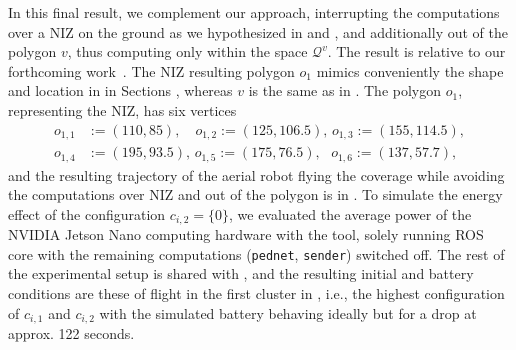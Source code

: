 In this final result, we complement our approach, interrupting the computations over a NIZ on the ground as we hypothesized in  and , and additionally out of the polygon $v$, thus computing only within the space $\mathcal{Q}^v$. The result is relative to our forthcoming work~\citep{seewald202Xenergy}. The NIZ resulting polygon $o_1$ mimics conveniently the shape and location in  in Sections , whereas $v$ is the same as in . The polygon $o_1$, representing the NIZ, has six vertices
\begin{equation}\begin{split}
  o_{1,1}&:=(110,85),\,\,\,\,\,\,o_{1,2}:=(125,106.5),\,o_{1,3}:=(155,114.5),\\
  o_{1,4}&:=(195,93.5),\,o_{1,5}:=(175,76.5),\,\,\,\,o_{1,6}:=(137,57.7),
\end{split}\end{equation}
and the resulting trajectory of the aerial robot flying the coverage while avoiding the computations over NIZ and out of the polygon is in .
To simulate the energy effect of the configuration $c_{i,2}=\{0\}$, we evaluated the average power of the NVIDIA Jetson Nano computing hardware with the \powprof{} tool, solely running ROS core with the remaining computations ({\small\tt pednet}, {\small\tt sender}) switched off. The rest of the experimental setup is shared with , and the resulting initial and battery conditions are these of flight  in the first cluster in , i.e., the highest configuration of $c_{i,1}$ and $c_{i,2}$ with the simulated battery behaving ideally but for a drop at approx. 122 seconds.

